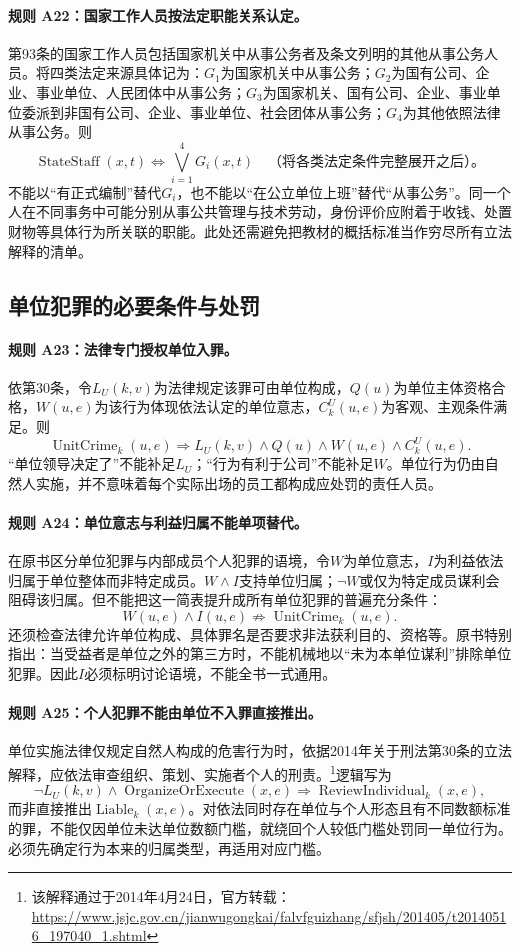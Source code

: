 \paragraph{规则 A22：国家工作人员按法定职能关系认定。}
第93条的国家工作人员包括国家机关中从事公务者及条文列明的其他从事公务人员。将四类法定来源具体记为：$G_1$为国家机关中从事公务；$G_2$为国有公司、企业、事业单位、人民团体中从事公务；$G_3$为国家机关、国有公司、企业、事业单位委派到非国有公司、企业、事业单位、社会团体从事公务；$G_4$为其他依照法律从事公务。则
\[
\operatorname{StateStaff}(x,t)
\Longleftrightarrow\bigvee_{i=1}^{4}G_i(x,t)
\quad\text{（将各类法定条件完整展开之后）。}
\]
不能以“有正式编制”替代$G_i$，也不能以“在公立单位上班”替代“从事公务”。同一个人在不同事务中可能分别从事公共管理与技术劳动，身份评价应附着于收钱、处置财物等具体行为所关联的职能。此处还需避免把教材的概括标准当作穷尽所有立法解释的清单。

\subsection{单位犯罪的必要条件与处罚}
\paragraph{规则 A23：法律专门授权单位入罪。}
依第30条，令$L_U(k,v)$为法律规定该罪可由单位构成，$Q(u)$为单位主体资格合格，$W(u,e)$为该行为体现依法认定的单位意志，$C^U_k(u,e)$为客观、主观条件满足。则
\[
\operatorname{UnitCrime}_k(u,e)
\Longrightarrow L_U(k,v)\land Q(u)\land W(u,e)\land C^U_k(u,e).
\]
“单位领导决定了”不能补足$L_U$；“行为有利于公司”不能补足$W$。单位行为仍由自然人实施，并不意味着每个实际出场的员工都构成应处罚的责任人员。

\paragraph{规则 A24：单位意志与利益归属不能单项替代。}
在原书区分单位犯罪与内部成员个人犯罪的语境，令$W$为单位意志，$I$为利益依法归属于单位整体而非特定成员。$W\land I$支持单位归属；$\neg W$或仅为特定成员谋利会阻碍该归属。但不能把这一简表提升成所有单位犯罪的普遍充分条件：
\[
W(u,e)\land I(u,e)\nRightarrow
\operatorname{UnitCrime}_k(u,e).
\]
还须检查法律允许单位构成、具体罪名是否要求非法获利目的、资格等。原书特别指出：当受益者是单位之外的第三方时，不能机械地以“未为本单位谋利”排除单位犯罪。因此$I$必须标明讨论语境，不能全书一式通用。

\paragraph{规则 A25：个人犯罪不能由单位不入罪直接推出。}
单位实施法律仅规定自然人构成的危害行为时，依据2014年关于刑法第30条的立法解释，应依法审查组织、策划、实施者个人的刑责。\footnote{该解释通过于2014年4月24日，官方转载：\url{https://www.jsjc.gov.cn/jianwugongkai/falvfguizhang/sfjsh/201405/t20140516_197040_1.shtml}}逻辑写为
\[
\neg L_U(k,v)\land\operatorname{OrganizeOrExecute}(x,e)
\Longrightarrow\operatorname{ReviewIndividual}_k(x,e),
\]
而非直接推出$\operatorname{Liable}_k(x,e)$。对依法同时存在单位与个人形态且有不同数额标准的罪，不能仅因单位未达单位数额门槛，就绕回个人较低门槛处罚同一单位行为。必须先确定行为本来的归属类型，再适用对应门槛。

